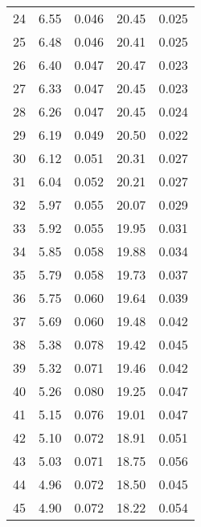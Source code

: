 \begin{table}
\begin{tabular}{c|ll|ll}
24 & 6.55 & 0.046 & 20.45 & 0.025 \\
25 & 6.48 & 0.046 & 20.41 & 0.025 \\
26 & 6.40 & 0.047 & 20.47 & 0.023 \\
27 & 6.33 & 0.047 & 20.45 & 0.023 \\
28 & 6.26 & 0.047 & 20.45 & 0.024 \\
29 & 6.19 & 0.049 & 20.50 & 0.022 \\
30 & 6.12 & 0.051 & 20.31 & 0.027 \\
31 & 6.04 & 0.052 & 20.21 & 0.027 \\
32 & 5.97 & 0.055 & 20.07 & 0.029 \\
33 & 5.92 & 0.055 & 19.95 & 0.031 \\
34 & 5.85 & 0.058 & 19.88 & 0.034 \\
35 & 5.79 & 0.058 & 19.73 & 0.037 \\
36 & 5.75 & 0.060 & 19.64 & 0.039 \\
37 & 5.69 & 0.060 & 19.48 & 0.042 \\
38 & 5.38 & 0.078 & 19.42 & 0.045 \\
39 & 5.32 & 0.071 & 19.46 & 0.042 \\
40 & 5.26 & 0.080 & 19.25 & 0.047 \\
41 & 5.15 & 0.076 & 19.01 & 0.047 \\
42 & 5.10 & 0.072 & 18.91 & 0.051 \\
43 & 5.03 & 0.071 & 18.75 & 0.056 \\
44 & 4.96 & 0.072 & 18.50 & 0.045 \\
45 & 4.90 & 0.072 & 18.22 & 0.054 \\
               \hline
        \end{tabular}
    \end{table}
    \clearpage

